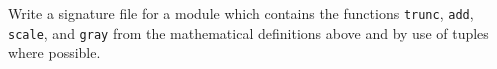 \label{signature}
Write a signature file for a module which contains the functions \lstinline{trunc}, \lstinline{add}, \lstinline{scale}, and \lstinline{gray} from the mathematical definitions above and by use of tuples where possible.
